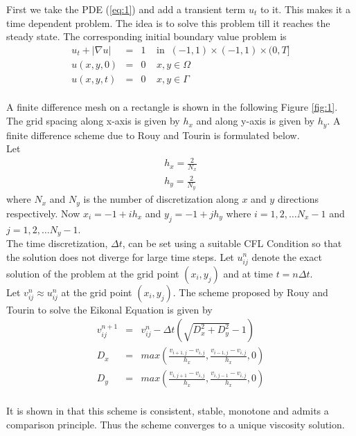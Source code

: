 \documentclass[11pt]{report}
\begin{document}
\noindent
First we take the PDE (\ref{eq:1}) and add a transient term $u_t$ to it. This makes it a time dependent problem. The idea is to solve this problem till it reaches the steady state. The corresponding initial boundary value problem is
\begin{eqnarray}
	u_t + |\nabla u| &=& 1 \;\;\;\; \text{in} \;\; (-1,1)\times(-1,1)\times(0,T] \\
	u(x,y,0) &=& 0 \;\;\;\; x,y \in \Omega\\
	u(x,y,t) &=& 0 \;\;\;\;  x,y \in \Gamma
\end{eqnarray}\\
\noindent
A finite difference mesh on a rectangle is shown in the following Figure \ref{fig:1}. The grid spacing along x-axis is given by $h_x$ and along y-axis  is given by $h_y$. A finite difference scheme due to Rouy and Tourin \cite{rouy} is  formulated below.\\

\noindent
Let 
\begin{eqnarray}
	h_x = \frac{2}{N_x}\\
	h_y = \frac{2}{N_y}
\end{eqnarray}
where $N_x$ and $N_y$ is the number of discretization along $x$ and $y$ directions respectively. Now $x_i = -1 + ih_x$ and $y_j = -1 + jh_y$ where $i = 1,2, \dots N_x-1$ and $j = 1,2, \dots N_y-1$.\\

\noindent
The time discretization, $\Delta t$, can be set using a suitable CFL Condition so that the solution does not diverge for large time steps. Let $u_{ij}^n$ denote the exact solution of the problem at the grid point $(x_i,y_j)$ and at time $t = n\Delta t$.\\

\noindent
Let $v_{ij}^n \approx u_{ij}^n$ at the grid point $(x_i,y_j)$. The scheme proposed by Rouy and Tourin to solve the Eikonal Equation is given by
\begin{eqnarray}\label{eq:2}
	v_{ij}^{n+1} &=& v_{ij}^n - \Delta t\left(\sqrt{D_x^2 + D_y^2}-1\right)\\ 
	D_x &=& max\left(\frac{v_{i+1,j}-v_{i,j}}{h_x},\frac{v_{i-1,j}-v_{i,j}}{h_x},0\right)\\
	D_y &=& max\left(\frac{v_{i,j+1}-v_{i,j}}{h_x},\frac{v_{i,j-1}-v_{i,j}}{h_x},0\right) \label{eq:3}
\end{eqnarray}\\

\noindent
It is shown in \cite{yong} that this scheme is consistent, stable, monotone and admits a comparison principle. Thus the scheme converges to a unique viscosity solution. \\
\end{document}
